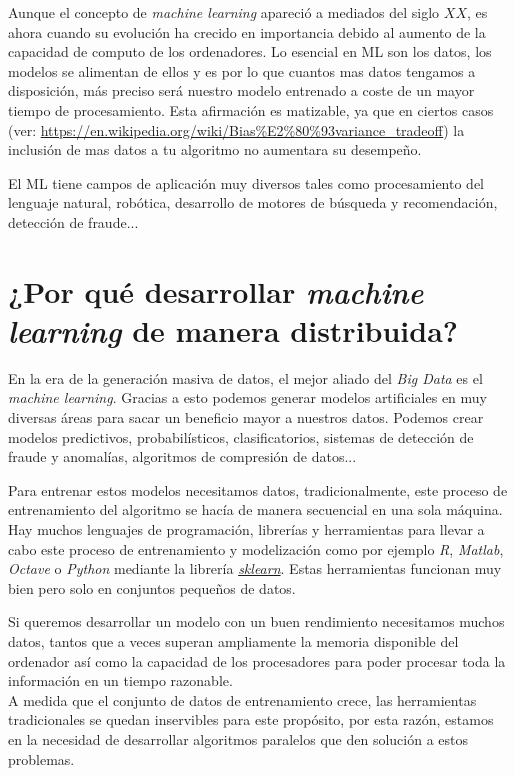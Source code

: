Aunque el concepto de \textit{machine learning} apareció a mediados del siglo $XX$, es ahora cuando su evolución
ha crecido en importancia debido al aumento de la capacidad de computo de los ordenadores.
Lo esencial en ML son los datos, los modelos se alimentan de ellos y es por lo que cuantos mas
datos tengamos a disposición, más preciso será nuestro modelo entrenado a coste de un mayor
tiempo de procesamiento. Esta afirmación es matizable, ya que en ciertos casos 
(ver: \url{https://en.wikipedia.org/wiki/Bias%E2%80%93variance_tradeoff})
la inclusión de mas datos a tu algoritmo no aumentara su desempeño.
\newline

El ML tiene campos de aplicación muy diversos tales como procesamiento del lenguaje natural, robótica,
desarrollo de motores de búsqueda y recomendación, detección de fraude...\\

\section[\textit{Machine Learning} distribuido]{¿Por qué desarrollar \textit{machine learning} de manera distribuida?}
En la era de la generación masiva de datos, el mejor aliado del \textit{Big Data} es el \textit{machine learning}.
Gracias a esto podemos generar modelos artificiales en muy diversas áreas para sacar un beneficio
mayor a nuestros datos. Podemos crear modelos predictivos, probabilísticos, clasificatorios,
sistemas de detección de fraude y anomalías, algoritmos de compresión de datos...
\newline

Para entrenar estos modelos necesitamos datos, tradicionalmente, este proceso de entrenamiento
del algoritmo se hacía de manera secuencial en una sola máquina. Hay muchos lenguajes de programación, 
librerías y herramientas para llevar a cabo este proceso de entrenamiento y modelización como por
ejemplo \textit{R}, \textit{Matlab}, \textit{Octave} o \textit{Python} mediante la librería 
\href{http://scikit-learn.org/stable/}{\textit{sklearn}}.
Estas herramientas funcionan muy bien pero solo en conjuntos pequeños de datos.
\newline

Si queremos desarrollar un modelo con un buen rendimiento necesitamos muchos datos, tantos que a veces
superan ampliamente la memoria disponible del ordenador así como la capacidad de los procesadores para
poder procesar toda la información en un tiempo razonable.\\
A medida que el conjunto de datos de entrenamiento crece, las herramientas tradicionales se quedan
inservibles para este propósito, por esta razón, estamos en la necesidad de desarrollar algoritmos
paralelos que den solución a estos problemas.
\newline

